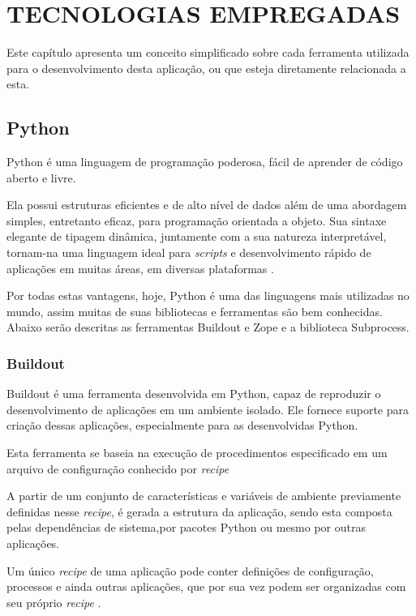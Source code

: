 \chapter{TECNOLOGIAS EMPREGADAS}
\thispagestyle{empty}

Este capítulo apresenta um conceito simplificado sobre cada ferramenta utilizada para o desenvolvimento desta aplicação, ou que esteja diretamente relacionada a esta.


\section{Python}

Python é uma linguagem de programação poderosa, fácil de aprender de código aberto e livre. 

Ela possui estruturas eficientes e de alto nível de dados além de uma abordagem simples, entretanto eficaz, para programação orientada a objeto. Sua sintaxe elegante de tipagem dinâmica, juntamente com a sua natureza interpretável, tornam-na uma linguagem ideal para \textit{scripts} e desenvolvimento rápido de aplicações em muitas áreas, em diversas plataformas \cite{GUIDO}.

Por todas estas vantagens, hoje, Python é uma das linguagens mais utilizadas no mundo, assim muitas de suas bibliotecas e ferramentas são bem conhecidas. Abaixo serão descritas as ferramentas Buildout e Zope e a biblioteca Subprocess.


\subsection{Buildout}
\label{Buildout}

Buildout é uma ferramenta desenvolvida em Python, capaz de reproduzir o desenvolvimento de aplicações em um ambiente isolado. Ele fornece suporte para criação dessas aplicações, especialmente para as desenvolvidas Python. 

Esta ferramenta se baseia na execução de procedimentos especificado em um arquivo de configuração conhecido por \textit{recipe}

A partir de um conjunto de características e variáveis de ambiente previamente definidas nesse \textit{recipe}, é gerada a estrutura da aplicação, sendo esta composta pelas dependências de sistema,por pacotes Python ou mesmo por outras aplicações.

Um único \textit{recipe} de uma aplicação pode conter definições de configuração, processos e ainda outras aplicações, que por sua vez podem ser organizadas com seu próprio \textit{recipe} \cite{BRANDOM}.

